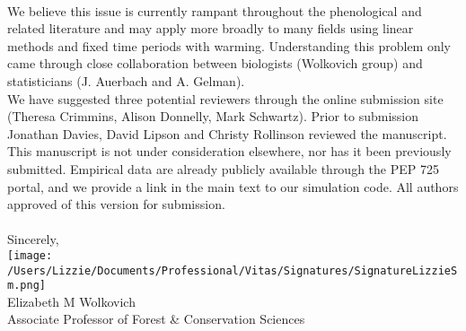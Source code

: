 \documentclass[11pt,a4paper]{article}
\begin{document}
\vspace{1.5ex}\\
We believe this issue is currently rampant throughout the phenological \citep[e.g.,][]{fu2015,Samplonius:2018aa,vitasse2018,meng2020} and related literature \citep[e.g.,][]{piao2017} and may apply more broadly to many fields using linear methods and fixed time periods with warming. Understanding this problem only came through close collaboration between biologists (Wolkovich group) and statisticians (J. Auerbach and A. Gelman). 
\vspace{1.5ex}\\
We have suggested three potential reviewers through the online submission site (Theresa Crimmins, Alison Donnelly, Mark Schwartz). Prior to submission Jonathan Davies, David Lipson and Christy Rollinson reviewed the manuscript. This manuscript is not under consideration elsewhere, nor has it been previously submitted. Empirical data are already publicly available through the PEP 725 portal, and we provide a link in the main text to our simulation code. All authors approved of this version for submission. \\
\vspace{1.5ex}\\
Sincerely,\\

\texttt{[image: /Users/Lizzie/Documents/Professional/Vitas/Signatures/SignatureLizzieSm.png]} \\

\noindent Elizabeth M Wolkovich\\
Associate Professor of Forest \& Conservation Sciences\\ 


\end{document}

